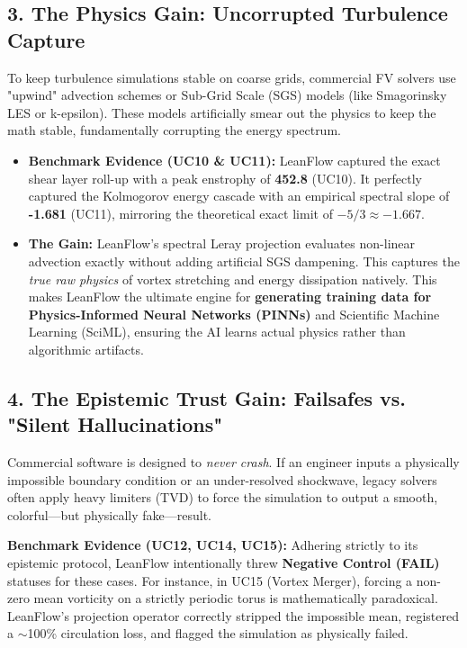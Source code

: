 \documentclass[11pt,a4paper]{article}
\begin{document}
\subsection*{3. The Physics Gain: Uncorrupted Turbulence Capture}

To keep turbulence simulations stable on coarse grids, commercial FV solvers use "upwind" advection schemes or Sub-Grid Scale (SGS) models (like Smagorinsky LES or k-epsilon). These models artificially smear out the physics to keep the math stable, fundamentally corrupting the energy spectrum.

\begin{itemize}
    \item \textbf{Benchmark Evidence (UC10 \& UC11):} LeanFlow captured the exact shear layer roll-up with a peak enstrophy of \textbf{452.8} (UC10). It perfectly captured the Kolmogorov energy cascade with an empirical spectral slope of \textbf{-1.681} (UC11), mirroring the theoretical exact limit of $-5/3 \approx -1.667$.
    \item \textbf{The Gain:} LeanFlow’s spectral Leray projection evaluates non-linear advection exactly without adding artificial SGS dampening. This captures the \textit{true raw physics} of vortex stretching and energy dissipation natively. This makes LeanFlow the ultimate engine for \textbf{generating training data for Physics-Informed Neural Networks (PINNs)} and Scientific Machine Learning (SciML), ensuring the AI learns actual physics rather than algorithmic artifacts.
\end{itemize}

\subsection*{4. The Epistemic Trust Gain: Failsafes vs. "Silent Hallucinations"}

Commercial software is designed to \textit{never crash}. If an engineer inputs a physically impossible boundary condition or an under-resolved shockwave, legacy solvers often apply heavy limiters (TVD) to force the simulation to output a smooth, colorful---but physically fake---result.

\begin{tcolorbox}[colback=blue!5!white,colframe=blue!75!black,title=IMPORTANT]
\textbf{Benchmark Evidence (UC12, UC14, UC15):} Adhering strictly to its epistemic protocol, LeanFlow intentionally threw \textbf{Negative Control (FAIL)} statuses for these cases. For instance, in UC15 (Vortex Merger), forcing a non-zero mean vorticity on a strictly periodic torus is mathematically paradoxical. LeanFlow’s projection operator correctly stripped the impossible mean, registered a $\sim$100\% circulation loss, and flagged the simulation as physically failed.
\end{tcolorbox}
\end{document}
